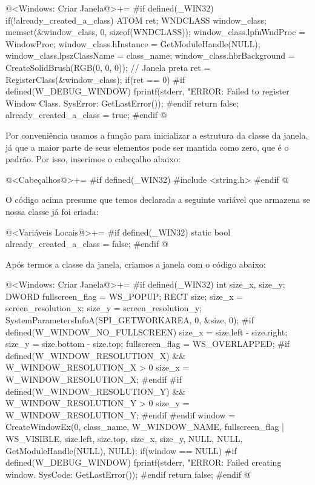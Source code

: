 \iniciocodigo
@<Windows: Criar Janela@>+=
#if defined(_WIN32)
if(!already_created_a_class){
  ATOM ret;
  WNDCLASS window_class;
  memset(&window_class, 0, sizeof(WNDCLASS));
  window_class.lpfnWndProc = WindowProc;
  window_class.hInstance = GetModuleHandle(NULL);
  window_class.lpszClassName = class_name;
  window_class.hbrBackground = CreateSolidBrush(RGB(0, 0, 0)); // Janela preta
  ret = RegisterClass(&window_class);
  if(ret == 0){
#if defined(W_DEBUG_WINDOW)
    fprintf(stderr, "ERROR: Failed to register Window Class. SysError: %
            GetLastError());
#endif
    return false;
  }
  already_created_a_class = true;
}
#endif
@
\fimcodigo

Por conveniência usamos a função  para inicializar
a estrutura da classe da janela, já que a maior parte de seus
elementos pode ser mantida como zero, que é o padrão. Por isso,
inserimos o cabeçalho abaixo:

\iniciocodigo
@<Cabeçalhos@>+=
#if defined(_WIN32)
#include <string.h>
#endif
@
\fimcodigo

O código acima presume que temos declarada a seguinte variável que
armazena se nossa classe já foi criada:

\iniciocodigo
@<Variáveis Locais@>+=
#if defined(_WIN32)
static bool already_created_a_class = false;
#endif
@
\fimcodigo

Após termos a classe da janela, criamos a janela com o código
abaixo:

\iniciocodigo
@<Windows: Criar Janela@>+=
#if defined(_WIN32)
{
  int size_x, size_y;
  DWORD fullscreen_flag = WS_POPUP;
  RECT size;
  size_x = screen_resolution_x;
  size_y = screen_resolution_y;
  SystemParametersInfoA(SPI_GETWORKAREA, 0, &size, 0);
#if defined(W_WINDOW_NO_FULLSCREEN)
  size_x = size.left - size.right;
  size_y = size.bottom - size.top;
  fullscreen_flag = WS_OVERLAPPED;
#if defined(W_WINDOW_RESOLUTION_X) && W_WINDOW_RESOLUTION_X > 0
  size_x = W_WINDOW_RESOLUTION_X;
#endif
#if defined(W_WINDOW_RESOLUTION_Y) && W_WINDOW_RESOLUTION_Y > 0
  size_y = W_WINDOW_RESOLUTION_Y;
#endif
#endif
  window = CreateWindowEx(0, class_name,
                          W_WINDOW_NAME,
                          fullscreen_flag | WS_VISIBLE,
                          size.left, size.top, size_x, size_y,
                          NULL, NULL,
                          GetModuleHandle(NULL),
                          NULL);
  if(window == NULL){
#if defined(W_DEBUG_WINDOW)
    fprintf(stderr, "ERROR: Failed creating window. SysCode: %
            GetLastError());
#endif
    return false;
  }
}
#endif
@
\fimcodigo

